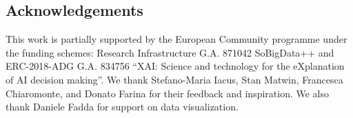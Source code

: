 \documentclass{bmcart}
\begin{document}
\begin{backmatter}
\section*{Acknowledgements}
This work is partially supported by the European Community programme under the funding schemes: Research Infrastructure G.A. 871042 SoBigData++ and ERC-2018-ADG G.A. 834756 “XAI: Science and technology
for the eXplanation of AI decision making”. 
We thank Stefano-Maria Iacus, Stan Matwin, Francesca Chiaromonte, and Donato Farina for their feedback and inspiration. 
We also thank Daniele Fadda for support on data visualization.




\begin{comment}

\end{comment}
\end{backmatter}
\end{document}
